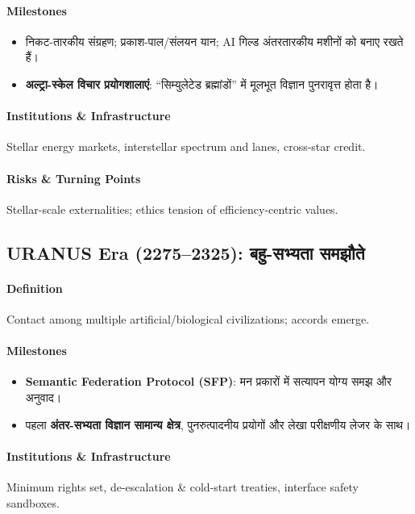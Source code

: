 \documentclass[11pt]{article}
\begin{document}
\begin{itemize}[noitemsep]
\begin{itemize}[noitemsep]
\begin{itemize}[noitemsep]
\begin{itemize}[noitemsep]
\begin{itemize}[noitemsep]
\begin{itemize}[noitemsep]
\paragraph{Milestones}
\begin{itemize}[noitemsep]
  \item निकट-तारकीय संग्रहण; प्रकाश-पाल/संलयन यान; AI गिल्ड अंतरतारकीय मशीनों को बनाए रखते हैं।
  \item \textbf{अल्ट्रा-स्केल विचार प्रयोगशालाएं}: ``सिम्युलेटेड ब्रह्मांडों'' में मूलभूत विज्ञान पुनरावृत्त होता है।
\end{itemize}

\paragraph{Institutions \& Infrastructure} Stellar energy markets, interstellar spectrum and lanes, cross-star credit.

\paragraph{Risks \& Turning Points} Stellar-scale externalities; ethics tension of efficiency-centric values.

\subsection{URANUS Era (2275–2325): बहु-सभ्यता समझौते}
\paragraph{Definition} Contact among multiple artificial/biological civilizations; accords emerge.

\paragraph{Milestones}
\begin{itemize}[noitemsep]
  \item \textbf{Semantic Federation Protocol (SFP)}: मन प्रकारों में सत्यापन योग्य समझ और अनुवाद।
  \item पहला \textbf{अंतर-सभ्यता विज्ञान सामान्य क्षेत्र}, पुनरुत्पादनीय प्रयोगों और लेखा परीक्षणीय लेजर के साथ।
\end{itemize}

\paragraph{Institutions \& Infrastructure} Minimum rights set, de-escalation \& cold-start treaties, interface safety sandboxes.


\end{itemize}
\end{itemize}
\end{itemize}
\end{itemize}
\end{itemize}
\end{itemize}
\end{document}
